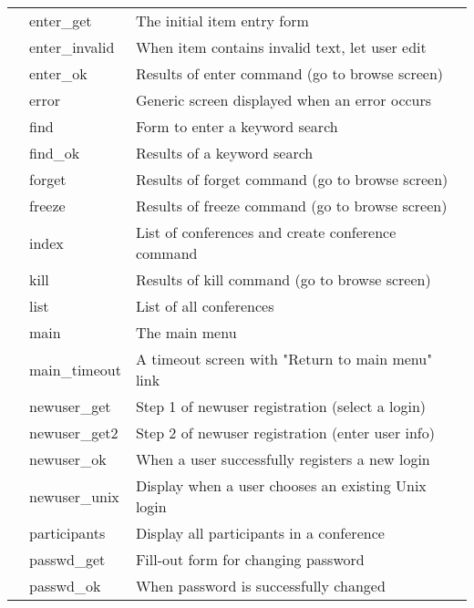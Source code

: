 \documentclass[twoside]{report}
\begin{document}
\begin{supertabular}{lll}
         & enter\_get
           & The initial item entry form \\
         & enter\_invalid
           & When item contains invalid text, let user edit \\
         & enter\_ok
           & Results of enter command (go to browse screen) \\
         & error
           & Generic screen displayed when an error occurs \\
         & find
           & Form to enter a keyword search \\
         & find\_ok
           & Results of a keyword search \\
         & forget
           & Results of forget command (go to browse screen) \\
         & freeze
           & Results of freeze command (go to browse screen) \\
         & index
           & List of conferences and create conference command \\
         & kill
           & Results of kill command (go to browse screen) \\
         & list
           & List of all conferences \\
         & main
           & The main menu \\
         & main\_timeout
           & A timeout screen with "Return to main menu" link \\
         & newuser\_get
           & Step 1 of newuser registration (select a login) \\
         & newuser\_get2
           & Step 2 of newuser registration (enter user info) \\
         & newuser\_ok
           & When a user successfully registers a new login \\
         & newuser\_unix
           & Display when a user chooses an existing Unix login \\
         & participants
           & Display all participants in a conference \\
         & passwd\_get 
           & Fill-out form for changing password \\
         & passwd\_ok
           & When password is successfully changed \\

\end{supertabular}
\end{document}
